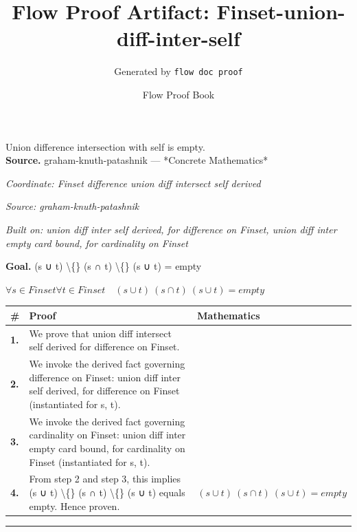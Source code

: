 \documentclass[11pt]{article}
\title{Flow Proof Artifact: Finset-union-diff-inter-self}
\author{Generated by \texttt{flow doc proof}}
\date{Flow Proof Book}
\theoremstyle{definition}
\begin{document}
\maketitle
Union difference intersection with self is empty.\\[0.5em]
\textbf{Source.} graham-knuth-patashnik — *Concrete Mathematics*\\[0.5em]
\bigskip
{}\par
\smallskip\noindent\textit{Coordinate: Finset \cdot difference \cdot union diff intersect self derived}\par
\smallskip\noindent\textit{Source: graham-knuth-patashnik}\par
\smallskip\noindent\textit{Built on: union diff inter self derived, for difference on Finset, union diff inter empty card bound, for cardinality on Finset}\par
\medskip
\noindent\textbf{Goal.} (s ∪ t) \textbackslash\{\} (s ∩ t) \textbackslash\{\} (s ∪ t) = empty\par
\noindent$\displaystyle \forall s \in Finset \forall t \in Finset\quad (s ∪ t) \ (s ∩ t) \ (s ∪ t) = empty$\par
\medskip
\noindent
\begin{tabular}{@{} >{\raggedright\arraybackslash}p{} >{\raggedright\arraybackslash}p{} >{\raggedleft\arraybackslash}p{} @{}}
\textbf{\#} & \textbf{Proof} & \textbf{Mathematics} \\
\midrule
\textbf{1.} & We prove that union diff intersect self derived for difference on Finset. & \\[0.45em]
\textbf{2.} & We invoke the derived fact governing difference on Finset: union diff inter self derived, for difference on Finset (instantiated for s, t). & \\[0.45em]
\textbf{3.} & We invoke the derived fact governing cardinality on Finset: union diff inter empty card bound, for cardinality on Finset (instantiated for s, t). & \\[0.45em]
\textbf{4.} & From step 2 and step 3, this implies (s ∪ t) \textbackslash\{\} (s ∩ t) \textbackslash\{\} (s ∪ t) equals empty. Hence proven. & $\displaystyle (s ∪ t) \ (s ∩ t) \ (s ∪ t) = empty$ \\[0.45em]
\bottomrule
\end{tabular}
\label{thm:Finset-difference-union_diff_intersect_self_derived}
\par\medskip\hrule
\end{document}

